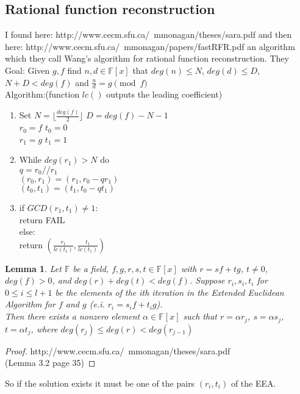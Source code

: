 \documentclass[12pt]{article}
\newcommand{\floor}[1]{\lfloor #1 \rfloor}
\newtheorem{lemma}{Lemma}
\begin{document}
\subsection{Rational function reconstruction}
I found here: http://www.cecm.sfu.ca/~mmonagan/theses/sara.pdf and then here: http://www.cecm.sfu.ca/~mmonagan/papers/fastRFR.pdf
an algorithm which they call Wang's algorithm for rational function reconstruction. They \\
Goal: Given $g,f$ find $n, d \in \mathbb{F}[x]$ that $deg(n) \leq N$, $deg(d) \leq D$, $N + D < deg(f)$ and $\frac{n}{d} = g \pmod{f}$\\
Algorithm:(function $lc()$ outputs the leading coefficient)
\begin{enumerate}
	\item Set $N = \floor{\frac{deg(f)}{2}}$ $D = deg(f) - N - 1$\\
			$r_0 = f$  $t_0 = 0$\\
			$r_1 = g$  $t_1 = 1$\\
	\item While $deg(r_1) > N$ do\\
			$q = r_0 // r_1$\\
			$(r_0, r_1) = (r_1, r_0 - qr_1)$\\
			$(t_0, t_1) = (t_1, t_0 - qt_1)$\\
	\item if $GCD(r_1, t_1) \neq 1$:\\
			return FAIL\\
		  else:\\
			return $(\frac{r_1}{lc(t_1)}, \frac{t_1}{lc(t_1)})$
\end{enumerate}
\begin{lemma}
Let $\mathbb{F}$ be a field, $f, g, r, s, t \in \mathbb{F}[x]$ with $r = sf + tg$, $t \neq 0$, $deg(f) > 0$, and $deg(r) + deg(t) <deg(f)$.
Suppose $r_i, s_i, t_i$ for $0 \leq i \leq l + 1$ be the elements of the ith iteration in the Extended Euclidean Algorithm for $f$ and $g$ (e.i. $r_i = s_if + t_ig$). \\
Then there exists a nonzero element $\alpha \in \mathbb{F}[x]$ such that $r = \alpha r_j$, $s = \alpha s_j$, $t = \alpha t_j$, where $deg(r_j) \leq deg(r) < deg(r_{j-1})$
\end{lemma}
\begin{proof}
http://www.cecm.sfu.ca/~mmonagan/theses/sara.pdf \\(Lemma 3.2 page 35)
\end{proof}

So if the solution exists it must be one of the pairs $(r_i, t_i)$ of the EEA.
\end{document}
